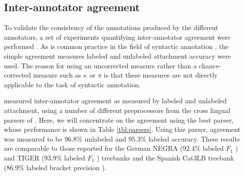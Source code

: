 \documentclass[10pt,a4paper]{article}
\begin{document}

%

\subsection{Inter-annotator agreement}
\label{sc:inter-a}
To validate the consistency of the annotations produced by the different
annotators, a set of experiments quantifying inter-annotator agreement were
performed \cite{Skjaerholt:13}. As is common practice in the field of
syntactic annotation \cite{Civit:ea:03,Brants:00,Bra:Han:02,Hajic:04}, the
simple agreement measures labeled and unlabeled attachment accuracy were
used. The reason for using an uncorrected measure rather than a
chance-corrected measure such as $\kappa$ or $\pi$ is that these measures are
not directly applicable to the task of syntactic annotation.

 measured inter-annotator agreement as measured by
labeled and unlabeled attachment, using a number of different preprocessors
from the cross lingual parsers of . Here, we will
concentrate on the agreement using the best parser, whose performance is shown
in Table \ref{tbl:parsers}. Using this parser, agreement was measured to be
96.8\% unlabeled and 95.3\% labeled accuracy. These results are comparable
to those reported for the German NEGRA (92.4\% labeled
$F_1$ \cite{Brants:00}) and TIGER (93.9\% labeled $F_1$ \cite{Bra:Han:02})
treebanks and the Spanish Cat3LB treebank (86.9\% labeled bracket
precision \cite{Civit:ea:03}).
\end{document}
